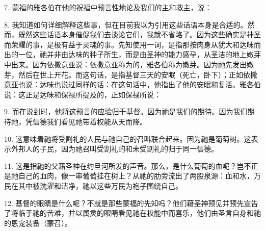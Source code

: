 7. 蒙福的雅各伯在他的祝福中预言性地论及我们的主和救主，说：\par

8. 我知道如何详细解释这些事，但在目前我以为引用这些话语本身是合适的。然而，既然这些话语本身催促我们去谈论它们，我就不省略了。因为这些确实是神圣而荣耀的事，是极有益于灵魂的事。先知使用一词，是指那按肉身从犹大和达味而出的一位，祂并非由达味的种子所生，而是由圣神的能力感孕，从圣洁的地上嫩芽中出来。因为依撒意亚说：依撒意亚称为的，雅各伯称为嫩芽。因为祂先发出嫩芽，然后在世上开花。而这句话，是指基督三天的安眠（死亡，卧下）；正如依撒意亚也说：达味也说过同样的话：在这句话中，他指出了他的安眠和复活。雅各伯说：这正是达味和保禄所提及的，正如保禄所说：\par

9. 而在说到时，他将这预言的应验归于基督。因为祂是我们的期待。因为我们期待祂，凭信德我们看见祂带着权能从天而降。\par

10. 这意味着祂将受割礼的人民与祂自己的召叫联合起来。因为祂是葡萄树。这表示外邦人的子民，因为祂召叫受割礼的和未受割礼的归于同一信德。\par

11. 这是指祂的父藉圣神在约旦河所发的声音。那么，是什么葡萄的血呢？岂不正是祂自己的血肉，像一串葡萄挂在树上？从祂的肋旁流出了两股泉源：血和水，万民在其中被洗濯和洁净，祂以这些万民为袍子围绕自己。\par

12. 基督的眼睛是什么呢？不就是那些蒙福的先知吗？他们藉圣神预见并预先宣告了将临于祂的苦难，并以属灵的眼睛看见祂在权能中而喜乐，他们由圣言自身和祂的恩宠装备（蒙召）。\par

